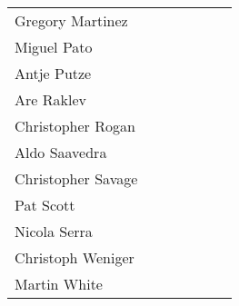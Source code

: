 \begin{center}
\begin{tabular*}{0.99\textwidth}{@{\extracolsep{\fill}}|lcccccc|}
  Gregory Martinez      & \M&   & \C &    &    &    \\
  Miguel Pato           &   &   &    &    & \M &    \\
  Antje Putze           & \M&   & \M &    & \M &    \\
  Are Raklev            &   &\M &    & \M &    &    \\
  Christopher Rogan     &   &\M &    & \M &    &    \\
  Aldo Saavedra         & \M&\M &    & \M &    &    \\
  Christopher Savage    &   &   & \M &    & \C &    \\
  Pat Scott             & \C&\M & \M & \M & \M &    \\
  Nicola Serra          &   &   &    & \M &    & \M \\
  Christoph Weniger     & \M&\M & \M &    & \C &    \\
  Martin White          &   &\M &    & \C &    &    \\
  \hline
\end{tabular*}
\end{center}


